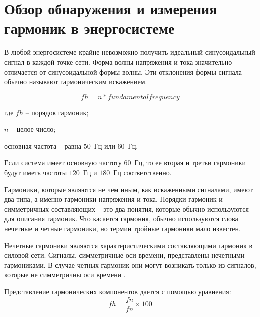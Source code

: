 \section{Обзор обнаружения и измерения гармоник в энергосистеме} \label{sec:ch1/sec2}
В любой энергосистеме крайне невозможно получить идеальный синусоидальный сигнал в каждой точке сети. Форма волны напряжения и тока значительно отличается от синусоидальной формы волны. Эти отклонения формы сигнала обычно называют гармоническим искажением.

\begin{equation}
	\label{eq:equation1.11}
	fh = n * fundamental frequency
\end{equation} 

где $fh$ – порядок гармоник;

$n$ – целое число;

основная частота – равна $50$~Гц или $60$~Гц.

Если система имеет основную частоту $60$~Гц, то ее вторая и третьи гармоники будут иметь частоты $120$~Гц и $180$~Гц соответственно.


Гармоники, которые являются не чем иным, как искаженными сигналами, имеют два типа, а именно гармоники напряжения и тока. Порядки гармоник и симметричных составляющих – это два понятия, которые обычно используются для описания гармоник. Что касается гармоник, обычно используются слова нечетные и четные гармоники, но термин тройные гармоники мало известен.

Нечетные гармоники являются характеристическими составляющими гармоник в силовой сети. Сигналы, симметричные оси времени, представлены нечетными гармониками. В случае четных гармоник они могут возникать только из сигналов, которые не симметричны оси времени \cite{soni2014review}.
 
Представление гармонических компонентов дается с помощью уравнения:  
\begin{equation}
	\label{eq:equation1.12}
	fh = \frac{fn}{fn}\times 100
\end{equation} 

